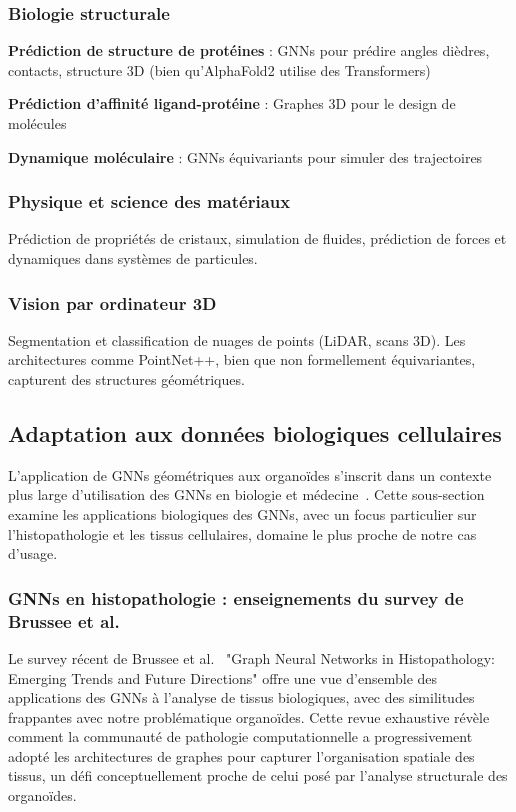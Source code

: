 \subsubsection{Biologie structurale}

\textbf{Prédiction de structure de protéines} : GNNs pour prédire angles dièdres, contacts, structure 3D (bien qu'AlphaFold2 utilise des Transformers)

\textbf{Prédiction d'affinité ligand-protéine} : Graphes 3D pour le design de molécules

\textbf{Dynamique moléculaire} : GNNs équivariants pour simuler des trajectoires

\subsubsection{Physique et science des matériaux}

Prédiction de propriétés de cristaux, simulation de fluides, prédiction de forces et dynamiques dans systèmes de particules.

\subsubsection{Vision par ordinateur 3D}

Segmentation et classification de nuages de points (LiDAR, scans 3D). Les architectures comme PointNet++, bien que non formellement équivariantes, capturent des structures géométriques.

\subsection{Adaptation aux données biologiques cellulaires}

L'application de GNNs géométriques aux organoïdes s'inscrit dans un contexte plus large d'utilisation des GNNs en biologie et médecine~\cite{Zhang2021GNN,Lecca2023}. Cette sous-section examine les applications biologiques des GNNs, avec un focus particulier sur l'histopathologie et les tissus cellulaires, domaine le plus proche de notre cas d'usage.

\subsubsection{GNNs en histopathologie : enseignements du survey de Brussee et al.}

Le survey récent de Brussee et al.~\cite{Brussee2024} "Graph Neural Networks in Histopathology: Emerging Trends and Future Directions" offre une vue d'ensemble des applications des GNNs à l'analyse de tissus biologiques, avec des similitudes frappantes avec notre problématique organoïdes. Cette revue exhaustive révèle comment la communauté de pathologie computationnelle a progressivement adopté les architectures de graphes pour capturer l'organisation spatiale des tissus, un défi conceptuellement proche de celui posé par l'analyse structurale des organoïdes.

